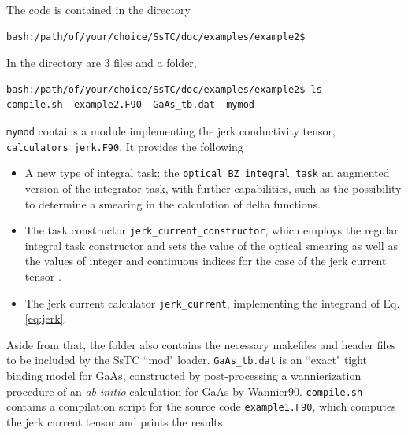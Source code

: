 \documentclass[10pt,a4paper]{article}
\begin{document}
The code is contained in the directory
\begin{codebox}{}
\begin{verbatim}
bash:/path/of/your/choice/SsTC/doc/examples/example2$
\end{verbatim}
\end{codebox}
In the directory are 3 files and a folder,
\begin{codebox}{}
\begin{verbatim}
bash:/path/of/your/choice/SsTC/doc/examples/example2$ ls
compile.sh  example2.F90  GaAs_tb.dat  mymod
\end{verbatim}
\end{codebox}
\verb|mymod| contains a module implementing the jerk conductivity tensor, \verb|calculators_jerk.F90|. It provides the following
\begin{tcolorbox}
\begin{itemize}
\item A new type of integral task: the \verb|optical_BZ_integral_task| an augmented version of the integrator task, with further capabilities, such as the possibility to determine a smearing in the calculation of delta functions.
\item The task constructor \verb|jerk_current_constructor|, which employs the regular integral task constructor and sets the value of the optical smearing as well as the values of integer and continuous indices for the case of the jerk current tensor .
\item The jerk current calculator \verb|jerk_current|, implementing the integrand of Eq. \eqref{eq:jerk}.
\end{itemize}
\end{tcolorbox}
Aside from that, the folder also contains the necessary makefiles and header files to be included by the SsTC ``mod" loader. \verb|GaAs_tb.dat| is an ``exact" tight binding model for GaAs, constructed by post-processing a wannierization procedure of an \textit{ab-initio} calculation for GaAs by Wannier90. \verb|compile.sh| contains a compilation script for the source code \verb|example1.F90|, which computes the jerk current tensor and prints the results.
\end{document}
